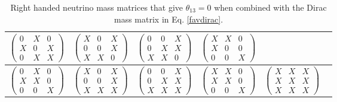 \documentclass[nofootinbib,showpacs]{revtex4}
\begin{document}
\begin{table}
\begin{center}
\begin{tabular}{|l|l|l|l|l|l|}
$\left(\begin{array}{ccc}0&X&0\\X&0&X\\0&X&X\end{array}\right)$&
$\left(\begin{array}{ccc}X&0&X\\0&0&X\\X&X&0\end{array}\right)$&
$\left(\begin{array}{ccc}0&0&X\\0&X&X\\X&X&0\end{array}\right)$&
$\left(\begin{array}{ccc}X&X&0\\X&0&0\\0&0&X\end{array}\right)$
\\
\hline
$\left(\begin{array}{ccc}0&X&0\\X&X&0\\0&0&X\end{array}\right)$&
$\left(\begin{array}{ccc}X&0&X\\0&0&X\\X&X&X\end{array}\right)$&
$\left(\begin{array}{ccc}0&0&X\\0&X&X\\X&X&X\end{array}\right)$&
$\left(\begin{array}{ccc}X&X&0\\X&X&0\\0&0&X\end{array}\right)$&
$\left(\begin{array}{ccc}X&X&X\\X&X&X\\X&X&X\end{array}\right)$
\\
\hline
\end{tabular}
\end{center}
\caption{Right handed neutrino mass matrices that give $\theta_{13}=0$ when combined with the Dirac mass matrix in Eq. \ref{favdirac}.}
\label{tabmajfav1}
\end{table}
\end{document}
